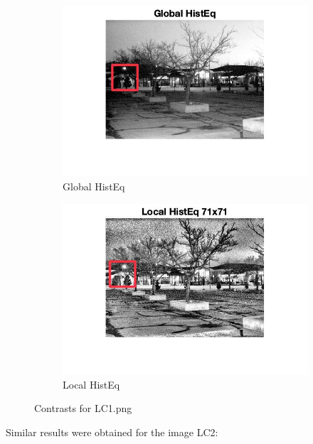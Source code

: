 \documentclass[12pt]{article}
\begin{document}
\begin{figure}[ht]
        \begin{subfigure}[b]{0.4\textwidth}
            \centering
            \includegraphics[width=\textwidth]{../images/LC1_globalHistEq_2.jpeg}
            \caption{Global HistEq}
        \end{subfigure}
        \hfill
        \begin{subfigure}[b]{0.4\textwidth}
            \centering
            \includegraphics[width=\textwidth]{../images/LC1_localHistEq_2.jpeg}
            \caption{Local HistEq}
        \end{subfigure}
    
        \caption{Contrasts for LC1.png}
    \end{figure}

    Similar results were obtained for the image LC2:
\end{document}
